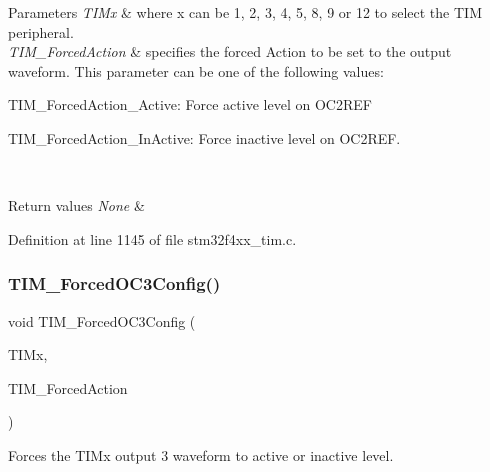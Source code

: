 \begin{DoxyParams}{Parameters}
{\em T\+I\+Mx} & where x can be 1, 2, 3, 4, 5, 8, 9 or 12 to select the T\+IM peripheral. \\
\hline
{\em T\+I\+M\+\_\+\+Forced\+Action} & specifies the forced Action to be set to the output waveform. This parameter can be one of the following values\+: \begin{DoxyItemize}
\item T\+I\+M\+\_\+\+Forced\+Action\+\_\+\+Active\+: Force active level on O\+C2\+R\+EF \item T\+I\+M\+\_\+\+Forced\+Action\+\_\+\+In\+Active\+: Force inactive level on O\+C2\+R\+EF. \end{DoxyItemize}
\\
\hline
\end{DoxyParams}

\begin{DoxyRetVals}{Return values}
{\em None} & \\
\hline
\end{DoxyRetVals}


Definition at line 1145 of file stm32f4xx\+\_\+tim.\+c.

\mbox{\label{group___t_i_m___group2_ga920b0fb4ca44fceffd1c3e441feebd8f}} 
\subsubsection{\texorpdfstring{T\+I\+M\+\_\+\+Forced\+O\+C3\+Config()}{TIM\_ForcedOC3Config()}}
{\footnotesize\ttfamily void T\+I\+M\+\_\+\+Forced\+O\+C3\+Config (\begin{DoxyParamCaption}\item[{\hyperlink{struct_t_i_m___type_def}{T\+I\+M\+\_\+\+Type\+Def} $\ast$}]{T\+I\+Mx,  }\item[{uint16\+\_\+t}]{T\+I\+M\+\_\+\+Forced\+Action }\end{DoxyParamCaption})}



Forces the T\+I\+Mx output 3 waveform to active or inactive level. 


